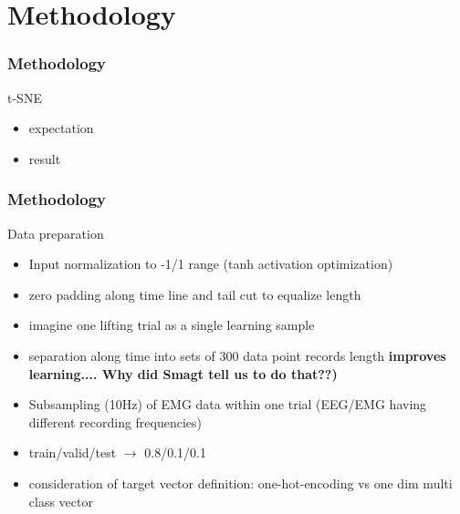 \documentclass{beamer}
\begin{document}
\section{Methodology}

\begin{frame}
\frametitle{Methodology}
t-SNE
\begin{itemize}
    \item expectation
    \item result
\end{itemize}
\end{frame}


\begin{frame}
\frametitle{Methodology}
Data preparation
\begin{itemize}
    \item Input normalization to -1/1 range (tanh activation optimization)
    \item zero padding along time line and tail cut to equalize length
    \item imagine one lifting trial as a single learning sample
    \item separation along time into sets of 300 data point records length \textbf{improves learning.... Why did Smagt tell us to do that??)}
   	\item Subsampling (10Hz) of EMG data within one trial (EEG/EMG having different recording frequencies)
   	\item train/valid/test $\rightarrow$ 0.8/0.1/0.1
    \item consideration of target vector definition: one-hot-encoding vs one dim multi class vector
\end{itemize}
\end{frame}
\end{document}
